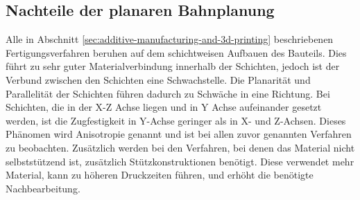         \subsection{Nachteile der planaren Bahnplanung}\label{subsec:disadvantages-of-planar-slicing}
        Alle in Abschnitt \ref{sec:additive-manufacturing-and-3d-printing} beschriebenen Fertigungsverfahren beruhen auf dem schichtweisen Aufbauen des Bauteils.
        Dies führt zu sehr guter Materialverbindung innerhalb der Schichten, jedoch ist der Verbund zwischen den Schichten eine Schwachstelle.
        Die Planarität und Parallelität der Schichten führen dadurch zu Schwäche in eine Richtung.
        Bei Schichten, die in der X-Z Achse liegen und in Y Achse aufeinander gesetzt werden, ist die Zugfestigkeit in Y-Achse geringer als in X- und Z-Achsen.
        Dieses Phänomen wird Anisotropie genannt und ist bei allen zuvor genannten Verfahren zu beobachten.
        Zusätzlich werden bei den Verfahren, bei denen das Material nicht selbststützend ist, zusätzlich Stützkonstruktionen benötigt.
        Diese verwendet mehr Material, kann zu höheren Druckzeiten führen, und erhöht die benötigte Nachbearbeitung.
        \cite{megersaInvestigationInfluenceFused2024}
        \cite{asimOptimization3DPrinting2025}
        \cite{toprakOptimizationTensileStrength2024}
        \cite{chabanIsotropicVsAnisotropic2025}
        \cite{huNonplanarAdditiveManufacturing2026}

